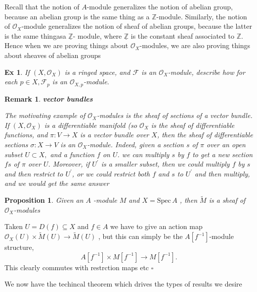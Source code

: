 \documentclass{article}
\newtheorem{proposition}[theorem]{Proposition}
\newtheorem{remark}[theorem]{Remark}
\newtheorem{exercise}[theorem]{Ex}
\newenvironment{Proof}{{\noindent \indent \it Proof:\quad}}{\hfill $\square$\par}
\begin{document}
Recall that the notion of $A$-module generalizes the notion of abelian group,
because an abelian group is the same thing as a $\mathbb Z$-module. Similarly, the notion of ${\mathcal{O}}_{X}$-module generalizes the notion of sheaf of abelian groups, because the latter is the same thingasa $\underline{\mathbb{Z}}$- module, where $\underline{\mathbb{Z}}$ is the constant sheaf associated to $\mathbb{Z}$. Hence when we are proving things about $\mathcal{O}_{X}$-modules, we are also proving things about sheaves of abelian groups
\begin{exercise}
    If $(X,{\mathcal{O}}_{X})$ is a ringed space, and $\mathcal{F}$ is an ${\mathcal{O}}_{X}$-module, describe how for each $p\in X,{\mathcal{F}}_{p}$ is an ${\mathcal{O}}_{X,p}$-module.
\end{exercise}
\begin{remark}
    \textbf{vector bundles}
    
    The motivating example of ${\mathcal{O}}_{X}$-modules is the sheaf of sections of a vector bundle. If $(X,{\mathcal{O}}_{X})$ is a differentiable manifold (so ${\mathcal{O}}_{X}$ is the sheaf of differentiable functions, and $\pi : V \to X$ is a vector bundle over $X$, then the sheaf of differentiable sections $\sigma\colon X\to V$ is an ${\mathcal{O}}_{X}$-module. Indeed, given a section $s$ of $\pi$ over an open subset $U\subset X,$ and a function $f$ on $U$. we can multiply $s$ by $f$ to get a new section $fs$ of $\pi$ over $U$. Moreover, if $U^\prime$ is a smaller subset, then we could multiply $f$ by $s$ and then restrict to $U^\prime$, or we could restrict both $f$ and $s$ to $U^\prime$ and then multiply, and we would get the same answer
\end{remark}

\begin{proposition}
    Given an $A$ -module $M$ and $X={\mathrm{Spec}}\,A$ , then $\widetilde{{M}}$ is a sheaf of ${\mathcal{O}}_{X}$-modules
\end{proposition}

\begin{Proof}
    Taken $U=D(f)\subseteq X$ and $f\in A$ we have to give an action map ${\mathcal{O}}_{X}(U)\times{\widetilde{M}}(U)\to{\widetilde{M}}(U)$ , but this can simply be the $A[f^{-1}]$-module structure,
$$
A[f^{-1}]\times M[f^{-1}]\longrightarrow M[f^{-1}]. 
$$
This clearly commutes with restrction maps etc
\end{Proof}

We now have the techincal theorem which drives the types of results we desire
\end{document}
